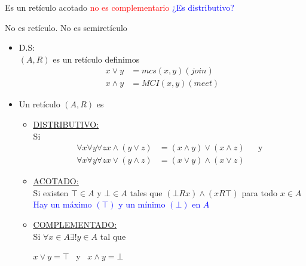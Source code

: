 \documentclass[12pt, twoside]{article}
\begin{document}
Es un retículo acotado \textcolor{red}{no es complementario}
\textcolor{blue}{¿Es distributivo?}
\begin{figure}[H]
	\centering
	
\end{figure}

No es retículo. No es semiretículo
\begin{figure}[H]
	\centering
	
\end{figure}

\begin{itemize}
	\item D.S:\\
		$(A,R)$ es un retículo definimos
		\begin{align*}
			x\vee y &= mcs(x,y)(join)\\
			x\wedge y &= MCI(x,y)(meet)
		\end{align*}
	\item Un retículo $(A,R)$ es
		\begin{itemize}
			\item \underline{\underline{DISTRIBUTIVO:}}\\
			Si
			\begin{align*}
				\forall x \forall y \forall z x \wedge (y \vee z ) &= (x \wedge y) \vee (x \wedge z)
					&& \text{y}\\
				\forall x \forall y \forall z x \vee (y \wedge z ) &= (x \vee y) \wedge (x \vee z)
			\end{align*}
		\item \underline{\underline{ACOTADO:}}\\
			Si existen $\top \in A$ y $\bot \in A$
			tales que $(\bot Rx)\wedge (xR\top)$
			para todo $x\in A$\\
			\textcolor{blue}{Hay un máximo $(\top)$ y un mínimo $(\bot )$ en $A$}
		\item \underline{\underline{COMPLEMENTADO:}}\\
			Si $\forall x \in A \exists ! y \in A$ tal que
			\begin{center}
				$x \vee y = \top$ \ y \ $x \wedge y = \bot$
			\end{center}
		\end{itemize}
\end{itemize}
\end{document}
